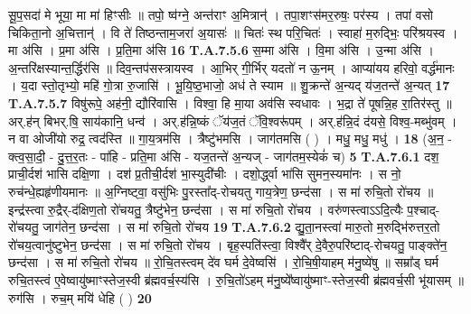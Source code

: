 \documentclass[17pt]{extarticle}
\begin{document}
                  सू॒प॒सदा॑ मे भूया॒ मा मा॑ हिꣳसीः ॥ तपो॒ ष्व॑ग्ने॒ अन्त॑राꣳ अ॒मित्रान्॑ ।  तपा॒शꣳस॑मर॒रुषः॒ पर॑स्य । तपा॑ वसो चिकिता॒नो अ॒चित्तान्॑ । वि ते॑ तिष्ठन्ताम॒जरा॑ अ॒यासः॑ ॥ चितः॑ स्थ परि॒चितः॑ । स्वाहा॑ म॒रुद्भिः॒ परि॑श्रयस्व । मा अ॑सि । प्र॒मा अ॑सि । प्र॒ति॒मा अ॑सि \textbf{ 16} \newline
                  \newline
                                                                  \textbf{ T.A.7.5.6} \newline
                  स॒म्मा अ॑सि । वि॒मा अ॑सि । उ॒न्मा अ॑सि । अ॒न्तरि॑क्षस्यान्त॒र्द्धिर॑सि ॥  दिव॒न्तप॑सस्त्रायस्व । आ॒भिर् गी॒र्भिर् यदतो॑ न ऊ॒नम् ।  आप्या॑यय हरिवो॒ वर्द्ध॑मानः । य॒दा स्तो॒तृभ्यो॒ महि॑ गो॒त्रा रु॒जासि॑ । भू॒यि॒ष्ठ॒भाजो॒ अध॑ ते स्याम ॥ शु॒क्रन्ते॑ अ॒न्यद् य॑ज॒तन्ते॑ अ॒न्यत् \textbf{ 17} \newline
                  \newline
                                                                  \textbf{ T.A.7.5.7} \newline
                  विषु॑रूपे॒ अह॑नी॒ द्यौरि॑वासि । विश्वा॒ हि मा॒या अव॑सि स्वधावः । भ॒द्रा ते॑ पूषन्नि॒ह रा॒तिर॑स्तु ॥ अर्.ह॑न् बिभर्.षि॒ साय॑कानि॒ धन्व॑ । अर्.ह॑न्नि॒ष्कं ॅय॑ज॒तं ॅवि॒श्वरू॑पम् । अर्.ह॑न्नि॒दं द॑यसे॒ विश्व॒-मब्भु॑वम् । न वा ओजी॑यो रुद्र॒ त्वद॑स्ति ॥ गा॒य॒त्रम॑सि । त्रैष्टु॑भमसि । जाग॑तमसि ( ) । मधु॒ मधु॒ मधु॑ । \textbf{ 18} \newline
                  \newline
                                                        (अ॒न॒ - क्त्व॒सा॒दी॒ - दु॒त्त॒र॒तः - पा॑हि - प्रति॒मा अ॑सि - यज॒तन्ते॑ अ॒न्यज् - जाग॑तम॒स्येकं॑ च) \textbf{5} \newline \newline
                                \textbf{ T.A.7.6.1} \newline
                  दश॒ प्राची॒र्दश॑ भासि दक्षि॒णा । दश॑ प्र॒तीची॒र्दश॑ भा॒स्युदी॑चीः । दशो॒र्द्ध्वा भा॑सि सुमन॒स्यमा॑नः । स नो॒ रुच॑न्धे॒ह्यहृ॑णीयमानः ॥  अ॒ग्निष्ट्वा॒ वसु॑भिः पु॒रस्ता᳚द्-रोचयतु गाय॒त्रेण॒ छन्द॑सा । स मा॑ रुचि॒तो रो॑चय ॥ इन्द्र॑स्त्वा रु॒द्रैर्-द॑क्षिण॒तो रो॑चयतु॒ त्रैष्टु॑भेन॒ छन्द॑सा ।  स मा॑ रुचि॒तो रो॑चय । वरु॑णस्त्वाऽऽदि॒त्यैः प॒श्चाद्-रो॑चयतु॒ जाग॑तेन॒ छन्द॑सा ।  स मा॑ रुचि॒तो रो॑चय \textbf{ 19} \newline
                  \newline
                                                                  \textbf{ T.A.7.6.2} \newline
                  द्यु॒ता॒नस्त्वा॑ मारु॒तो म॒रुद्भि॑रुत्तर॒तो रो॑चय॒त्वानु॑ष्टुभेन॒ छन्द॑सा । स मा॑ रुचि॒तो रो॑चय । बृह॒स्पति॑स्त्वा॒ विश्वै᳚र् दे॒वैरु॒परि॑ष्टाद्-रोचयतु॒ पाङ्क्ते॑न॒ छन्द॑सा । स मा॑ रुचि॒तो रो॑चय ॥ रो॒चि॒तस्त्वम् दे॑व घर्म दे॒वेष्वसि॑ ।  रो॒चि॒षी॒याहम् म॑नु॒ष्ये॑षु ॥  सम्रा᳚ड् घर्म रुचि॒तस्त्वं ए॒वेष्वायु॑ष्माꣳस्तेज॒स्वी ब्र॑ह्मवर्च॒स्य॑सि । रु॒चि॒तो॑ऽहम् म॑नु॒ष्ये᳚ष्वायु॑ष्माꣳ-स्तेज॒स्वी ब्र॑ह्मवर्च॒सी भू॑यासम् ॥ रुग॑सि । रुच॒म् मयि॑ धेहि ( ) \textbf{ 20} \newline
\end{document}
